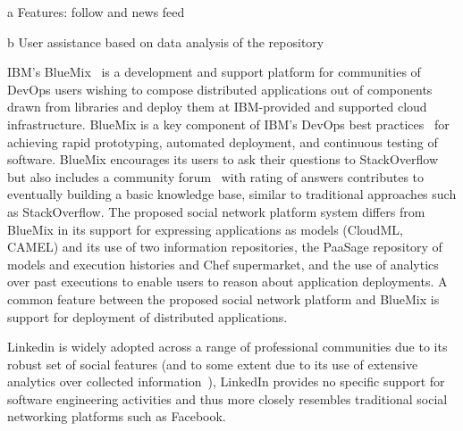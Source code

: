 \begin{table*}
\begin{threeparttable}
\begin{tabular}{c|c|c|c|c|c|c|c|c|c|cc}
\end{tabular}

\begin{tablenotes}
      \small
       \item[a] Features: follow and news feed
      \item[b] User assistance based on data analysis of the repository
\end{tablenotes}
\end{threeparttable}
\end{table*}

IBM's BlueMix~\cite{Bluemix-dev} is a development and support platform for communities of DevOps users wishing to compose distributed applications out of components drawn from libraries and deploy them at IBM-provided and supported cloud infrastructure.  BlueMix is a key component of IBM's DevOps best practices~\cite{ibm-devops} for achieving rapid prototyping, automated deployment, and continuous testing of software. BlueMix encourages its users to ask their questions to StackOverflow but also includes a community forum~\cite{Bluemix-dev} with rating of answers contributes to eventually building a basic knowledge base, similar to traditional approaches such as StackOverflow.  The proposed social network platform system differs from BlueMix in its support for expressing applications as models (CloudML, CAMEL) and its use of two information repositories, the PaaSage repository of models and execution histories and Chef supermarket, and the use of analytics over past executions to enable users to reason about application deployments. A common feature between the proposed social network platform and BlueMix is support for deployment of distributed applications. 

Linkedin is widely adopted across a range of professional communities due to its robust set of social features (and to some extent due to its use of extensive analytics over collected information~\cite{sumbaly2013big}), LinkedIn provides no specific support for software engineering activities and thus more closely resembles traditional social networking platforms such as Facebook.

